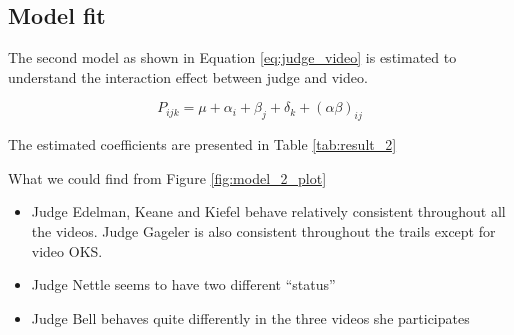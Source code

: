 \documentclass{monashthesis}
\begin{document}
\hypertarget{model-fit-1}{%
\subsection{Model fit}\label{model-fit-1}}

The second model as shown in Equation \ref{eq:judge_video} is estimated to understand the interaction effect between judge and video.

\begin{equation}\label{eq:judge_video}
P_{ijk} = \mu + \alpha_i + \beta_j +\delta_k + (\alpha\beta)_{ij}
\end{equation}

The estimated coefficients are presented in Table \ref{tab:result_2}

What we could find from Figure \ref{fig:model_2_plot}

\begin{itemize}
\tightlist
\item
  Judge Edelman, Keane and Kiefel behave relatively consistent throughout all the videos. Judge Gageler is also consistent throughout the trails except for video OKS.
\item
  Judge Nettle seems to have two different ``status''
\item
  Judge Bell behaves quite differently in the three videos she participates
\end{itemize}
\end{document}
